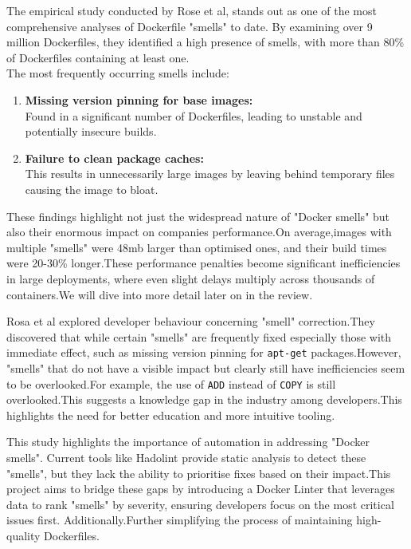 The empirical study conducted by Rose et al, stands out as one of the most comprehensive analyses of Dockerfile "smells" to date. By examining over 9 million Dockerfiles, they identified a high presence of smells, with more than 80\% of Dockerfiles containing at least one.\\The most frequently occurring smells include:
\begin{enumerate}
    \item \textbf{Missing version pinning for base images:}\\Found in a significant number of Dockerfiles, leading to unstable and potentially insecure builds.
    \item \textbf{Failure to clean package caches:}\\This results in unnecessarily large images by leaving behind temporary files causing the image to bloat. 
\end{enumerate}
These findings highlight not just the widespread nature of "Docker smells" but also their enormous impact on companies performance.On average,images with multiple "smells" were 48mb larger than optimised ones, and their build times were 20-30\% longer.These performance penalties become significant inefficiencies in large deployments, where even slight delays multiply across thousands of containers.We will dive into more detail later on in the review.

Rosa et al explored developer behaviour concerning "smell" correction.They discovered that while certain "smells" are frequently fixed especially those with immediate effect, such as missing version pinning for \verb|apt-get| packages.However, "smells" that do not have a visible impact but clearly still have inefficiencies seem to be overlooked.For example, the use of \verb|ADD| instead of \verb|COPY| is still overlooked.This suggests a knowledge gap in the industry among developers.This highlights the need for better education and more intuitive tooling.\cite{DockerArtifacts}

This study highlights the importance of automation in addressing "Docker smells". Current tools like Hadolint provide static analysis to detect these "smells", but they lack the ability to prioritise fixes based on their impact.This project aims to bridge these gaps by introducing a Docker Linter that leverages data to rank "smells" by severity, ensuring developers focus on the most critical issues first. Additionally.Further simplifying the process of maintaining high-quality Dockerfiles.

